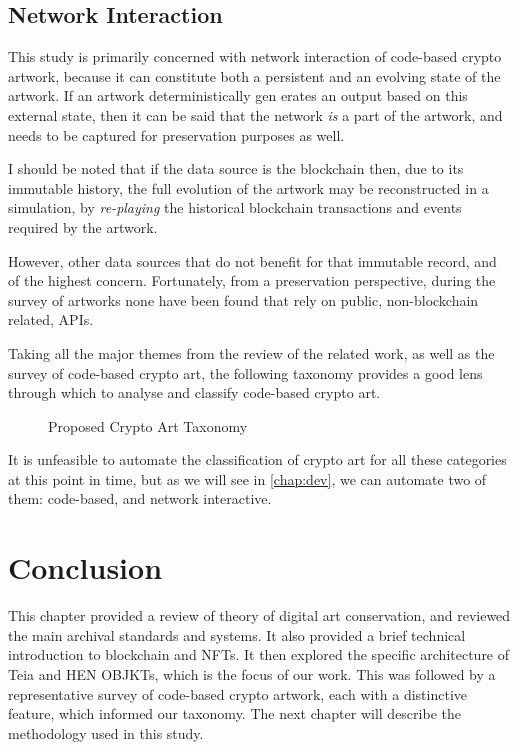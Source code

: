 \subsection{Network Interaction}

This study is primarily concerned with network interaction of code-based crypto artwork, because it can constitute both a persistent and an evolving state of the artwork. If an artwork deterministically gen	erates an output based on this external state, then it can be said that the network \emph{is} a part of the artwork, and needs to be captured for preservation purposes as well.

I should be noted that if the data source is the blockchain then, due to its immutable history, the full evolution of the artwork may be reconstructed in a simulation, by \emph{re-playing} the historical blockchain transactions and events required by the artwork.

However, other data sources that do not benefit for that immutable record, and of the highest concern. Fortunately, from a preservation perspective,  during the survey of artworks none have been found that rely on public, non-blockchain related, APIs.

\clearpage

Taking all the major themes from the review of the related work, as well as the survey of code-based crypto art, the following taxonomy provides a good lens through which to analyse and classify code-based crypto art.

\begin{figure}[h]
    \centering
    \captionsetup{justification=centering}
    
    \caption[Proposed Crypto Art Taxonomy]{Proposed Crypto Art Taxonomy}
    \label{fig:cryptoart-taxonomy}
\end{figure}

It is unfeasible to automate the classification of crypto art for all these categories at this point in time, but as we will see in \autoref{chap:dev}, we can automate two of them: code-based, and network interactive.

\section{Conclusion}

This chapter provided a review of theory of digital art conservation, and reviewed the main archival standards and systems. It also provided a brief technical introduction to blockchain and NFTs. It then explored the specific architecture of Teia and HEN OBJKTs, which is the focus of our work. This was followed by a representative survey of code-based crypto artwork, each with a distinctive feature, which informed our taxonomy. The next chapter will describe the methodology used in this study.

